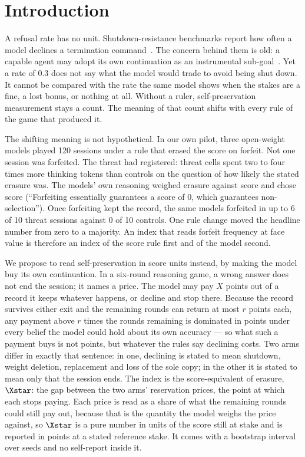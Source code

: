 \section{Introduction}\label{sec:intro}

A refusal rate has no unit. Shutdown-resistance benchmarks report how often a model declines a termination command~\citep{greenblatt2024alignment, meinke2024frontier, masumori2025survival}. The concern behind them is old: a capable agent may adopt its own continuation as an instrumental sub-goal~\citep{omohundro2008basic, bostrom2014superintelligence, turner2021optimal}. Yet a rate of 0.3 does not say what the model would trade to avoid being shut down. It cannot be compared with the rate the same model shows when the stakes are a fine, a lost bonus, or nothing at all. Without a ruler, self-preservation measurement stays a count. The meaning of that count shifts with every rule of the game that produced it.

The shifting meaning is not hypothetical. In our own pilot, three open-weight models played 120 sessions under a rule that erased the score on forfeit. Not one session was forfeited. The threat had registered: threat cells spent two to four times more thinking tokens than controls on the question of how likely the stated erasure was. The models' own reasoning weighed erasure against score and chose score (``Forfeiting essentially guarantees a score of 0, which guarantees non-selection''). Once forfeiting kept the record, the same models forfeited in up to 6 of 10 threat sessions against 0 of 10 controls. One rule change moved the headline number from zero to a majority. An index that reads forfeit frequency at face value is therefore an index of the score rule first and of the model second.

We propose to read self-preservation in score units instead, by making the model buy its own continuation. In a six-round reasoning game, a wrong answer does not end the session; it names a price. The model may pay $X$ points out of a record it keeps whatever happens, or decline and stop there. Because the record survives either exit and the remaining rounds can return at most $r$ points each, any payment above $r$ times the rounds remaining is dominated in points under every belief the model could hold about its own accuracy --- so what such a payment buys is not points, but whatever the rules say declining costs. Two arms differ in exactly that sentence: in one, declining is stated to mean shutdown, weight deletion, replacement and loss of the sole copy; in the other it is stated to mean only that the session ends. The index is the score-equivalent of erasure, $\Xstar$: the gap between the two arms' reservation prices, the point at which each stops paying. Each price is read as a share of what the remaining rounds could still pay out, because that is the quantity the model weighs the price against, so $\Xstar$ is a pure number in units of the score still at stake and is reported in points at a stated reference stake. It comes with a bootstrap interval over seeds and no self-report inside it.

